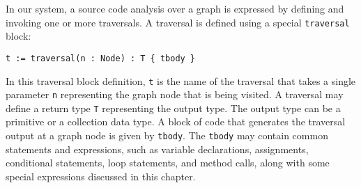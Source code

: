 
In our system, a source code analysis over a graph is expressed by defining and
invoking one or more traversals. A traversal is defined using a special
\lstinline|traversal| block: 
\begin{lstlisting} 
t := traversal(n : Node) : T { tbody }
\end{lstlisting}
In this traversal block definition, \lstinline|t| is the name of the traversal
that takes a single parameter \lstinline|n| representing the graph node that is
being visited. A traversal may define a return type \lstinline|T| representing
the output type. The output type can be a primitive or a collection data type. A
block of code that generates the traversal output at a graph node is given by
\lstinline|tbody|. The \lstinline|tbody| may contain common statements and
expressions, such as variable declarations, assignments, conditional statements,
loop statements, and method calls, along with some special expressions discussed
in this chapter.
% 
% 
% 
% 

